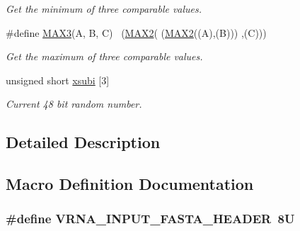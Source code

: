 \begin{DoxyCompactItemize}
\begin{DoxyCompactList}\small\item\em Get the minimum of three comparable values. \end{DoxyCompactList}\item 
\#define \hyperlink{group__utils_ga27c2f8e6ef48853a348897da2ef8e7f8}{M\+A\+X3}(A,  B,  C)  ~(\hyperlink{group__utils_gadd91367918fadbc8d585940d6206d6d2}{M\+A\+X2}(  (\hyperlink{group__utils_gadd91367918fadbc8d585940d6206d6d2}{M\+A\+X2}((A),(B))) ,(C)))\hypertarget{group__utils_ga27c2f8e6ef48853a348897da2ef8e7f8}{}\label{group__utils_ga27c2f8e6ef48853a348897da2ef8e7f8}

\begin{DoxyCompactList}\small\item\em Get the maximum of three comparable values. \end{DoxyCompactList}\item 
unsigned short \hyperlink{group__utils_gaf9a866c8417afda7368bbac939ab3c47}{xsubi} \mbox{[}3\mbox{]}
\begin{DoxyCompactList}\small\item\em Current 48 bit random number. \end{DoxyCompactList}\end{DoxyCompactItemize}


\subsection{Detailed Description}


\subsection{Macro Definition Documentation}
\subsubsection[{\texorpdfstring{V\+R\+N\+A\+\_\+\+I\+N\+P\+U\+T\+\_\+\+F\+A\+S\+T\+A\+\_\+\+H\+E\+A\+D\+ER}{VRNA_INPUT_FASTA_HEADER}}]{\setlength{\rightskip}{0pt plus 5cm}\#define V\+R\+N\+A\+\_\+\+I\+N\+P\+U\+T\+\_\+\+F\+A\+S\+T\+A\+\_\+\+H\+E\+A\+D\+ER~8U}\hypertarget{group__utils_ga2f0d8069e93d3ac54d9320d6bdb8e7e7}{}\label{group__utils_ga2f0d8069e93d3ac54d9320d6bdb8e7e7}


